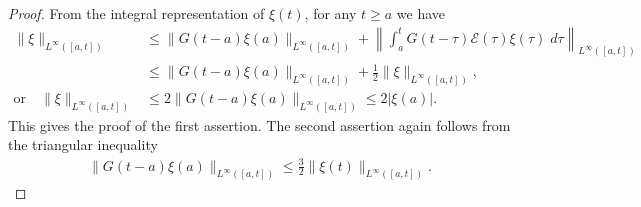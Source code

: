 \documentclass[a4paper,11pt]{article}
\newtheorem{proposition}{Proposition}[section]
\theoremstyle{remark}
\begin{document}
\begin{proof}
 From the integral representation of $\xi(t)$, for any $t\ge a$ we have
 \begin{align*}
 \|\xi\|_{L^\infty([a,t])} &\le \|G(t-a)\xi(a)\|_{L^\infty([a,t])} + \left\|\int_a^t G(t-\tau)\mathcal{E}(\tau)\xi(\tau) \; d\tau\right\|_{L^\infty([a,t])} \\
 &\le \|G(t-a)\xi(a)\|_{L^\infty([a,t])} + \frac{1}{2} \|\xi\|_{L^\infty([a,t])},\\
 \text{or} \quad \|\xi\|_{L^\infty([a,t])} &\le 2 \|G(t-a)\xi(a)\|_{L^\infty([a,t])} \le 2|\xi(a)|.
 \end{align*}
 This gives the proof of the first assertion. The second assertion again follows from the triangular inequality
 \begin{align*}
  \big\|G(t-a)\xi(a)\big\|_{L^\infty([a,t])} \le\frac{3}{2} \|\xi(t)\|_{L^\infty([a,t])}.
 \end{align*}
% 
%  
 
\end{proof}
%
\end{document}
